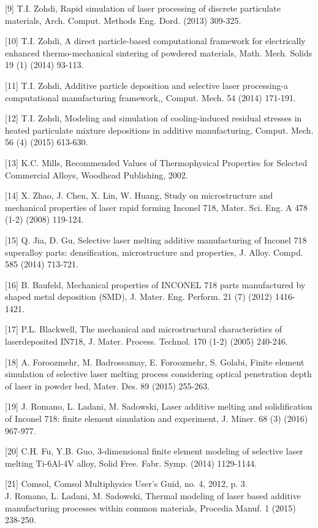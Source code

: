 \documentclass[10pt]{article}
\begin{document}
[9] T.I. Zohdi, Rapid simulation of laser processing of discrete particulate materials, Arch. Comput. Methods Eng. Dord. (2013) 309-325.

[10] T.I. Zohdi, A direct particle-based computational framework for electrically enhanced thermo-mechanical sintering of powdered materials, Math. Mech. Solids 19 (1) (2014) 93-113.

[11] T.I. Zohdi, Additive particle deposition and selective laser processing-a computational manufacturing framework,, Comput. Mech. 54 (2014) 171-191.

[12] T.I. Zohdi, Modeling and simulation of cooling-induced residual stresses in heated particulate mixture depositions in additive manufacturing, Comput. Mech. 56 (4) (2015) 613-630.

[13] K.C. Mills, Recommended Values of Thermophysical Properties for Selected Commercial Alloys, Woodhead Publishing, 2002.

[14] X. Zhao, J. Chen, X. Lin, W. Huang, Study on microstructure and mechanical properties of laser rapid forming Inconel 718, Mater. Sci. Eng. A 478 (1-2) (2008) 119-124.

[15] Q. Jia, D. Gu, Selective laser melting additive manufacturing of Inconel 718 superalloy parts: densification, microstructure and properties, J. Alloy. Compd. 585 (2014) 713-721.

[16] B. Baufeld, Mechanical properties of INCONEL 718 parts manufactured by shaped metal deposition (SMD), J. Mater. Eng. Perform. 21 (7) (2012) 1416-1421.

[17] P.L. Blackwell, The mechanical and microstructural characteristics of laserdeposited IN718, J. Mater. Process. Technol. 170 (1-2) (2005) 240-246.

[18] A. Foroozmehr, M. Badrossamay, E. Foroozmehr, S. Golabi, Finite element simulation of selective laser melting process considering optical penetration depth of laser in powder bed, Mater. Des. 89 (2015) 255-263.

[19] J. Romano, L. Ladani, M. Sadowski, Laser additive melting and solidification of Inconel 718: finite element simulation and experiment, J. Miner. 68 (3) (2016) 967-977.

[20] C.H. Fu, Y.B. Guo, 3-dimensional finite element modeling of selective laser melting Ti-6Al-4V alloy, Solid Free. Fabr. Symp. (2014) 1129-1144.

[21] Comsol, Comsol Multiphysics User's Guid, no. 4, 2012, p. 3.\\
[22] J. Romano, L. Ladani, M. Sadowski, Thermal modeling of laser based additive manufacturing processes within common materials, Procedia Manuf. 1 (2015) 238-250.
\end{document}
